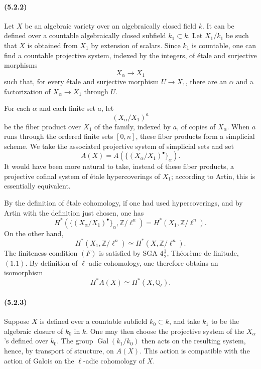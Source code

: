\documentclass[11pt]{article}
\theoremstyle{remark}
\newcommand{\Ql}{\mathbb{Q}_\ell}
\newcommand{\ZZ}{\mathbb{Z}}
\begin{document}
\paragraph{(5.2.2)}
Let \(X\) be an algebraic variety over an algebraically closed field \(k\).  It can be defined over a countable algebraically closed subfield \(k_1\subset k\).  Let \(X_1/k_1\) be such that \(X\) is obtained from \(X_1\) by extension of scalars.  Since \(k_1\) is countable, one can find a countable projective system, indexed by the integers, of étale and surjective morphisms
\[
X_\alpha\longrightarrow X_1
\]
such that, for every étale and surjective morphism \(U\to X_1\), there are an \(\alpha\) and a factorization of \(X_\alpha\to X_1\) through \(U\).

For each \(\alpha\) and each finite set \(a\), let
\[
(X_\alpha/X_1)^a
\]
be the fiber product over \(X_1\) of the family, indexed by \(a\), of copies of \(X_\alpha\).  When \(a\) runs through the ordered finite sets \([0,n]\), these fiber products form a simplicial scheme.  We take the associated projective system of simplicial sets and set
\[
A(X)=A(\{(X_\alpha/X_1)^\bullet\}_\alpha). \tag{5.2.2.2}
\]
It would have been more natural to take, instead of these fiber products, a projective cofinal system of étale hypercoverings of \(X_1\); according to Artin, this is essentially equivalent.

By the definition of étale cohomology, if one had used hypercoverings, and by Artin with the definition just chosen, one has
\[
H^*(\{(X_\alpha/X_1)^\bullet\}_\alpha,\ZZ/\ell^n)=H^*(X_1,\ZZ/\ell^n).
\]
On the other hand,
\[
H^*(X_1,\ZZ/\ell^n)\simeq H^*(X,\ZZ/\ell^n).
\]
The finiteness condition \((F)\) is satisfied by SGA \(4\frac12\), Théorème de finitude, \((1.1)\).  By definition of \(\ell\)-adic cohomology, one therefore obtains an isomorphism
\[
H^*A(X)\simeq H^*(X,\Ql).
\]

\paragraph{(5.2.3)}
Suppose \(X\) is defined over a countable subfield \(k_0\subset k\), and take \(k_1\) to be the algebraic closure of \(k_0\) in \(k\).  One may then choose the projective system of the \(X_\alpha\)'s defined over \(k_0\).  The group \(\operatorname{Gal}(k_1/k_0)\) then acts on the resulting system, hence, by transport of structure, on \(A(X)\).  This action is compatible with the action of Galois on the \(\ell\)-adic cohomology of \(X\).
\end{document}
